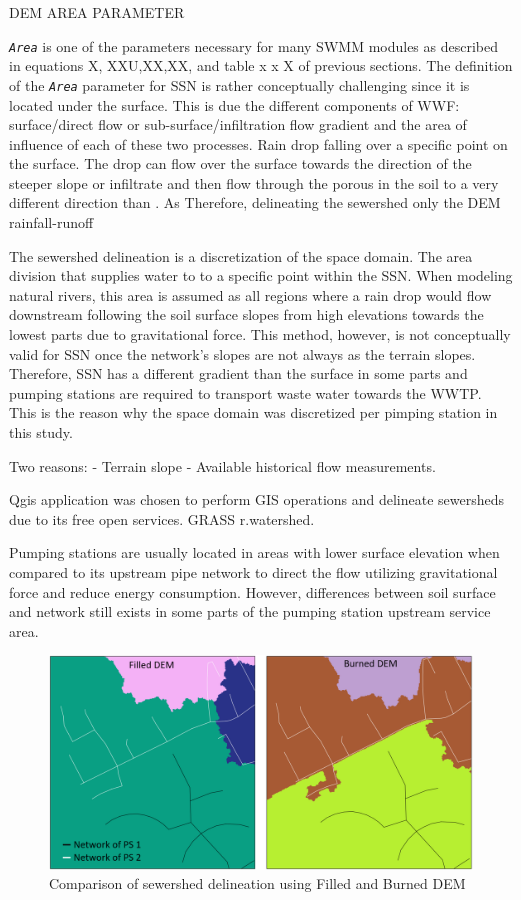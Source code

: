     
    
DEM AREA PARAMETER

\texttt{\textit{Area}} is one of the parameters necessary for many SWMM modules as described in equations X, XXU,XX,XX, and table x x X of previous sections. The definition of the \texttt{\textit{Area}} parameter for \acf{SSN} is rather conceptually challenging since it is located under the surface. This is due the different components of \ac{WWF}: surface/direct flow or sub-surface/infiltration flow gradient and the area of influence of each of these two processes. Rain drop falling over a specific point on the surface. The drop can flow over the surface towards the direction of the steeper slope or infiltrate and then flow through the porous in the soil to a very different direction than . As 
Therefore, delineating the sewershed only the \acf{DEM} rainfall-runoff

The sewershed delineation is a discretization of the space domain. The area division that supplies water to to a specific point within the \ac{SSN}. When modeling natural rivers, this area is assumed as all regions where a rain drop would flow downstream following the soil surface slopes from high elevations towards the lowest parts due to gravitational force. This method, however, is not conceptually valid for \ac{SSN} once the network's slopes are not always as the terrain slopes. Therefore, \ac{SSN} has a different gradient than the surface in some parts and pumping stations are required to transport waste water towards the \acf{WWTP}. This is the reason why the space domain was discretized per pimping station in this study.


Two reasons:
- Terrain slope
- Available historical flow measurements.

Qgis application was chosen to perform GIS operations and delineate sewersheds due to its free open services. GRASS r.watershed. 


Pumping stations are usually located in areas with lower surface elevation when compared to its upstream pipe network to direct the flow utilizing gravitational force and reduce energy consumption. However, differences between soil surface and network still exists in some parts of the pumping station upstream service area. 


\begin{figure}[h]
    \centering
	\includegraphics[scale=0.6]{figures/burnedxfilledDEM.png}
	\caption{Comparison of sewershed delineation using Filled and Burned DEM}
	\label{fig:filledxburned}
\end{figure}


